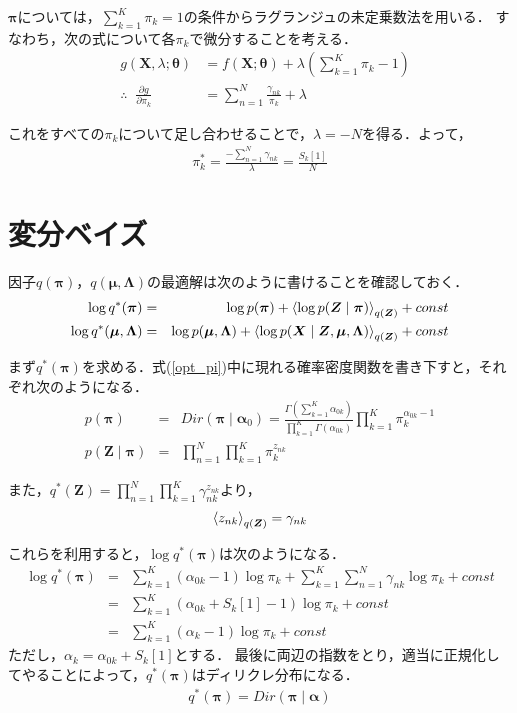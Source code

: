 \documentclass[uplatex]{jsarticle}
\begin{document}
$\bm{\pi}$については，$\sum_{k=1}^{K} \pi_k = 1$の条件からラグランジュの未定乗数法を用いる．
すなわち，次の式について各$\pi_k$で微分することを考える．
\begin{eqnarray*}
&g(\bm{X}, \lambda; \bm{\theta})& = f(\bm{X}; \bm{\theta}) + \lambda(\sum_{k=1}^K \pi_k - 1) \\
&\therefore \; \; \frac{\partial g}{\partial \pi_k}& = \sum_{n=1}^N \frac{\gamma_{nk}}{\pi_k} + \lambda
\end{eqnarray*}

これをすべての$\pi_k$について足し合わせることで，$\lambda = -N$を得る．よって，
\begin{eqnarray*}
\pi_k^* = \frac{-\sum_{n=1}^N \gamma_{nk}}{\lambda} = \frac{S_k[1]}{N}
\end{eqnarray*}

\section{変分ベイズ}
因子$q(\bm{\pi})$，$q(\bm{\mu}, \bm{\Lambda})$の最適解は次のように書けることを確認しておく．
\begin{eqnarray}
\label{opt_pi}
\log q^*(\bm{\pi}) &=& \log p(\bm{\pi}) + \Braket{\log p(\bm{Z} \mid \bm{\pi})}_{q(\bm{Z})} + const \\
\label{opt_mu_lam}
\log q^*(\bm{\mu}, \bm{\Lambda}) &=& \log p(\bm{\mu}, \bm{\Lambda}) + \Braket{\log p(\bm{X} \mid \bm{Z}, \bm{\mu}, \bm{\Lambda})}_{q(\bm{Z})} + const
\end{eqnarray}

まず$q^*(\bm{\pi})$を求める．式(\ref{opt_pi})中に現れる確率密度関数を書き下すと，それぞれ次のようになる．
\begin{eqnarray*}
p(\bm{\pi}) &=& Dir(\bm{\pi} \mid \bm{\alpha}_0) = \frac{\Gamma (\sum_{k=1}^K \alpha_{0k})}{\prod_{k=1}^K \Gamma (\alpha_{0k})} \prod_{k=1}^K \pi_k^{\alpha_{0k} - 1}\\
p(\bm{Z} \mid \bm{\pi}) &=& \prod_{n=1}^N \prod_{k=1}^K \pi_k^{z_{nk}}
\end{eqnarray*}

また，$q^*(\bm{Z}) = \prod_{n=1}^N \prod_{k=1}^K \gamma_{nk}^{z_{nk}}$より，
\begin{eqnarray}
\label{gamma_nk}
\Braket{z_{nk}}_{q(\bm{Z})} = \gamma_{nk} 
\end{eqnarray}

これらを利用すると，$\log q^*(\bm{\pi})$は次のようになる．
\begin{eqnarray*}
\log q^*(\bm{\pi}) &=& \sum_{k=1}^K (\alpha_{0k} - 1) \log \pi_k + \sum_{k=1}^K \sum_{n=1}^N \gamma_{nk} \log \pi_k + const \\
&=& \sum_{k=1}^K (\alpha_{0k} + S_k[1] - 1) \log \pi_k + const \\
&=& \sum_{k=1}^K (\alpha_k - 1) \log \pi_k + const
\end{eqnarray*}
ただし，$\alpha_k = \alpha_{0k} + S_k[1]$とする．
最後に両辺の指数をとり，適当に正規化してやることによって，$q^*(\bm{\pi})$はディリクレ分布になる．
\begin{eqnarray*}
q^*(\bm{\pi}) = Dir(\bm{\pi} \mid \bm{\alpha})
\end{eqnarray*}
\end{document}
